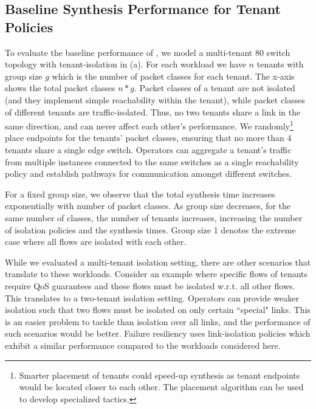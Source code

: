 \subsection{Baseline Synthesis Performance for Tenant Policies} \label{sec:baselineeval} 
 To evaluate the baseline
performance of \Name, we model a multi-tenant 80 switch
 topology with tenant-isolation in
(a).  For each workload we have $n$ tenants with
group size $g$ which is the number of packet classes for each
tenant. The x-axis shows the total packet classes $n*g$.  Packet
classes of a tenant are not isolated (and they implement simple
reachability within the tenant), while packet classes of different
tenants are traffic-isolated. Thus, no two tenants share a link in
the same direction, and can never
affect each other's performance.  We randomly\footnote{ Smarter
  placement of tenants could speed-up synthesis as tenant endpoints
  would be located closer to each other. The placement algorithm can
  be used to develop specialized tactics.}  place endpoints for the
tenants' packet classes, ensuring that no more than 4 tenants share a
single edge switch.  Operators can aggregate a tenant's traffic from
multiple instances connected to the same switches 
as a single reachability policy and establish
pathways for communication amongst different switches.

For a fixed group size, we observe that the total synthesis time
increases exponentially with number of packet classes.  As
 group size decreases, for the same number of classes, the 
number of tenants increases, increasing the number of isolation policies
and the synthesis times. 
Group size 1 denotes the
extreme case where all flows are isolated with each other.
 
While we evaluated a multi-tenant isolation setting, there are other
scenarios that translate to these workloads. Consider an example where
specific flows of tenants require QoS guarantees and these flows must
be isolated w.r.t. all other flows. This translates to a two-tenant
isolation setting. Operators can provide weaker isolation such that
two flows must be isolated on only certain ``special" links. 
This is an easier problem to tackle than isolation over all
links, and the performance of such scenarios would be better. 
Failure resiliency uses link-isolation policies which exhibit a similar
performance compared to the workloads considered here. 

